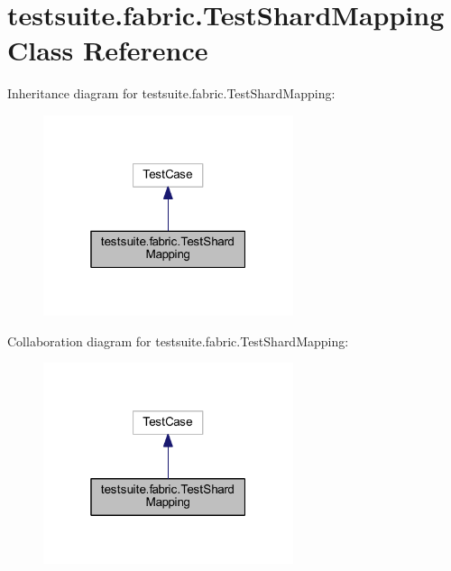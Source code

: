 \hypertarget{classtestsuite_1_1fabric_1_1_test_shard_mapping}{}\section{testsuite.\+fabric.\+Test\+Shard\+Mapping Class Reference}
\label{classtestsuite_1_1fabric_1_1_test_shard_mapping}


Inheritance diagram for testsuite.\+fabric.\+Test\+Shard\+Mapping\+:
\nopagebreak
\begin{figure}[H]
\begin{center}
\leavevmode
\includegraphics[width=208pt]{classtestsuite_1_1fabric_1_1_test_shard_mapping__inherit__graph}
\end{center}
\end{figure}


Collaboration diagram for testsuite.\+fabric.\+Test\+Shard\+Mapping\+:
\nopagebreak
\begin{figure}[H]
\begin{center}
\leavevmode
\includegraphics[width=208pt]{classtestsuite_1_1fabric_1_1_test_shard_mapping__coll__graph}
\end{center}
\end{figure}
